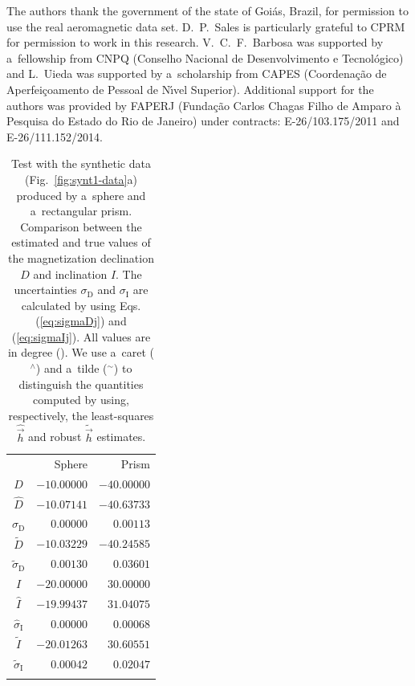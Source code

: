 \documentclass[journal abbreviation, npg]{copernicus}
\begin{document}
\begin{acknowledgements}
  The authors thank the government of the state of Goi\'{a}s, Brazil,
  for permission to use the real aeromagnetic data set. D.~P.~Sales is
  particularly grateful to CPRM for permission to work in this
  research.  V.~C.~F.~Barbosa was supported by a~fellowship from CNPQ
  (Conselho Nacional de Desenvolvimento e Tecnol\'{o}gico) and
  L.~Uieda was supported by a~scholarship from CAPES
  (Coordena\c{c}\~{a}o de Aperfei\c{c}oamento de Pessoal de N\'{\i}vel
  Superior). Additional support for the authors was provided by FAPERJ
  (Funda\c{c}\~{a}o Carlos Chagas Filho de Amparo \`{a} Pesquisa do
  Estado do Rio de Janeiro) under contracts: E-26/103.175/2011 and
  E-26/111.152/2014.
\end{acknowledgements}




\begin{table}[t]
\caption{Test with the synthetic data (Fig.~\ref{fig:synt1-data}a) produced
by a~sphere and a~rectangular prism. Comparison between the estimated and
true values of the magnetization declination $D$ and inclination $I$. The
uncertainties $\sigma_\mathrm{D}$ and $\sigma_\mathrm{I}$ are calculated by
using Eqs. (\ref{eq:sigmaDj}) and (\ref{eq:sigmaIj}). All values are in
degree ({\degree}). We use a~caret ($^{\wedge}$) and a~tilde ($^{\sim}$) to
distinguish the quantities computed by using, respectively, the least-squares
$\hat{\vec{h}}$ and robust $\tilde{\vec{h}}$ estimates.}
\begin{tabular}{crr}
\tophline
&Sphere &Prism \\
\middlehline
$D$ &$-10.00000$ &$-40.00000$ \\
$\hat{D}$ &$-10.07141$ &$-40.63733$ \\
$\hat{\sigma}_\mathrm{D}$ &$0.00000$ &$0.00113$  \\
$\tilde{D}$ &$-10.03229$ &$-40.24585$ \\
$\tilde{\sigma}_\mathrm{D}$ &$0.00130$ &$0.03601$ \\
$I$ &$-20.00000$ &$30.00000$ \\
$\hat{I}$ &$-19.99437$ &$31.04075$  \\
$\hat{\sigma}_\mathrm{I}$ &$0.00000$ &$0.00068$  \\
$\tilde{I}$ &$-20.01263$ &$30.60551$ \\
$\tilde{\sigma}_\mathrm{I}$ &$0.00042$ &$0.02047$ \\
\bottomhline
\end{tabular}
\label{tab:synt1-without-inter-anomaly}
\end{table}
\end{document}
